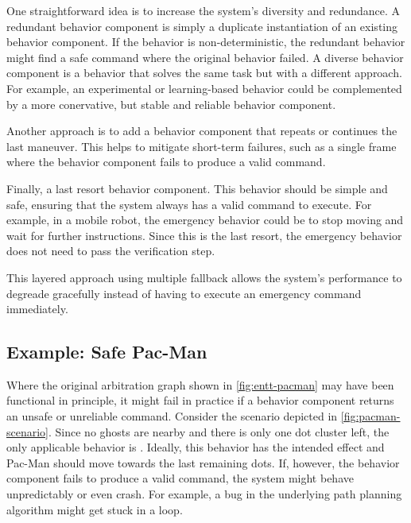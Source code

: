 One straightforward idea is to increase the system's diversity and redundance.
A redundant behavior component is simply a duplicate instantiation of an existing behavior component.
If the behavior is non-deterministic, the redundant behavior might find a safe command where the original behavior failed.
A diverse behavior component is a behavior that solves the same task but with a different approach.
For example, an experimental or learning-based behavior could be complemented by a more conervative, but stable and reliable behavior component.
 
Another approach is to add a behavior component that repeats or continues the last maneuver.
This helps to mitigate short-term failures, such as a single frame where the behavior component fails to produce a valid command.

Finally, a last resort behavior component.
This behavior should be simple and safe, ensuring that the system always has a valid command to execute.
For example, in a mobile robot, the emergency behavior could be to stop moving and wait for further instructions.
Since this is the last resort, the emergency behavior does not need to pass the verification step.

This layered approach using multiple fallback allows the system's performance to degreade gracefully instead of having to execute an emergency command immediately.

\subsection{Example: Safe Pac-Man}

Where the original arbitration graph shown in \cref{fig:entt-pacman} may have been functional in principle, it might fail in practice if a behavior component returns an unsafe or unreliable command.
Consider the scenario depicted in \cref{fig:pacman-scenario}.
Since no ghosts are nearby and there is only one dot cluster left, the only applicable behavior is .
Ideally, this behavior has the intended effect and Pac-Man should move towards the last remaining dots.
If, however, the behavior component fails to produce a valid command, the system might behave unpredictably or even crash.
For example, a bug in the underlying path planning algorithm might get stuck in a loop.


